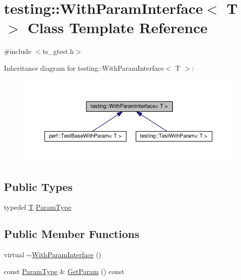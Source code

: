 \hypertarget{classtesting_1_1WithParamInterface}{\section{testing\-:\-:With\-Param\-Interface$<$ T $>$ Class Template Reference}
\label{classtesting_1_1WithParamInterface}
}


{\ttfamily \#include $<$ts\-\_\-gtest.\-h$>$}



Inheritance diagram for testing\-:\-:With\-Param\-Interface$<$ T $>$\-:\nopagebreak
\begin{figure}[H]
\begin{center}
\leavevmode
\includegraphics[width=350pt]{classtesting_1_1WithParamInterface__inherit__graph}
\end{center}
\end{figure}
\subsection*{Public Types}
\begin{DoxyCompactItemize}
\item 
typedef \hyperlink{calib3d_8hpp_a3efb9551a871ddd0463079a808916717}{T} \hyperlink{classtesting_1_1WithParamInterface_a343febaaebf1f025bda484f841d4fec1}{Param\-Type}
\end{DoxyCompactItemize}
\subsection*{Public Member Functions}
\begin{DoxyCompactItemize}
\item 
virtual \hyperlink{classtesting_1_1WithParamInterface_a4e170bd42fa5e8ce48b80cee6bb52e26}{$\sim$\-With\-Param\-Interface} ()
\item 
const \hyperlink{classtesting_1_1WithParamInterface_a343febaaebf1f025bda484f841d4fec1}{Param\-Type} \& \hyperlink{classtesting_1_1WithParamInterface_a38cdaa583cac86d14a79f91536d6e442}{Get\-Param} () const 
\end{DoxyCompactItemize}
